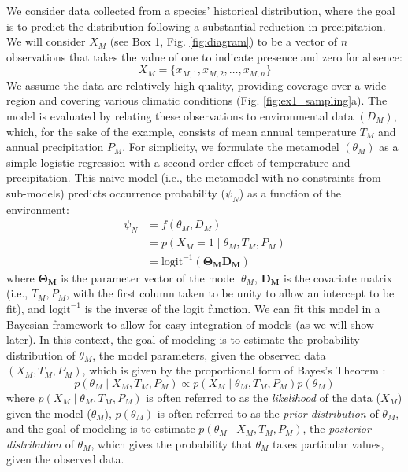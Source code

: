 \documentclass[11pt]{article}
\begin{document}
We consider data collected from a species' historical distribution, where the goal is to predict the distribution following a substantial reduction in precipitation. 
We will consider \(X_M\) (see Box 1, Fig. \ref{fig:diagram}) to be a vector of $n$ observations that takes the value of one to indicate presence and zero for absence:
\begin{equation}
X_M = \{x_{M,1}, x_{M,2}, \ldots, x_{M,n}\}
\end{equation}
We assume the data are relatively high-quality, providing coverage over a wide region and covering various climatic conditions (Fig. \ref{fig:ex1_sampling}a). 
The model is evaluated by relating these observations to environmental data \((D_M)\), which, for the sake of the example, consists of mean annual temperature $T_M$ and annual precipitation $P_M$. 
For simplicity, we formulate the metamodel \((\theta_M)\) as a simple logistic regression with a second order effect of temperature and precipitation. 
This naive model (i.e., the metamodel with no constraints from sub-models) predicts  occurrence probability (\(\psi_N\)) as a function of the environment:
\begin{equation}
\begin{aligned}
	\psi_N &= f\left(\theta_M, D_M \right) \\
	&= p \left (X_M = 1 \mid \theta_M, T_M, P_M \right) \\
	&=\text{logit}^{-1}\left( \mathbf{\Theta_M} \mathbf{D_M} \right)
\end{aligned}
\end{equation}
where \(\mathbf{\Theta_M}\) is the parameter vector of the model \(\theta_M\), \(\mathbf{D_M} \) is the covariate matrix (i.e., \(T_M, P_M\), with the first column taken to be unity to allow an intercept to be fit), and \(\text{logit}^{-1}\) is the inverse of the logit function.
We can fit this model in a Bayesian framework to allow for easy integration of models (as we will show later).
In this context, the goal of modeling is to estimate the probability distribution of \(\theta_M\), the model parameters, given the observed data \((X_M, T_M, P_M)\), which is given by the proportional form of Bayes's Theorem \citep[for readers unfamiliar with general concepts in Bayesian inference, a concise introduction can be found in ][]{Link2010}:
\begin{equation}
\label{eq:ex1_bayes}
	p\left (\theta_M \mid X_M,T_M,P_M \right ) \propto 
	p \left(X_M \mid \theta_M, T_M, P_M \right)
	p \left(\theta_M \right)
\end{equation}
where \(p\left(X_M \mid \theta_M, T_M, P_M \right)\) is often referred to as the \emph{likelihood} of the data (\(X_M\)) given the model (\(\theta_M\)), \(p\left(\theta_M \right)\) is often referred to as the \emph{prior distribution} of \(\theta_M\), and the goal of modeling is to estimate \(p\left (\theta_M \mid X_M,T_M,P_M \right )\), the \emph{posterior distribution} of \(\theta_M\), which gives the probability that \(\theta_M\) takes particular values, given the observed data.
\end{document}
